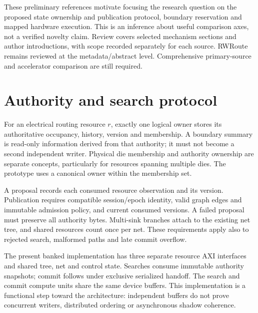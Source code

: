 \documentclass[10pt]{article}
\begin{document}
These preliminary references motivate focusing the research question on the
proposed state ownership and publication protocol, boundary reservation and mapped
hardware execution. This is an inference about useful comparison axes, not a
verified novelty claim. Review covers selected mechanism sections and author
introductions, with scope recorded separately for each source. RWRoute remains
reviewed at the metadata/abstract level. Comprehensive primary-source and
accelerator comparison are still required.

\section{Authority and search protocol}
For an electrical routing resource $r$, exactly one logical owner stores its
authoritative occupancy, history, version and membership. A boundary summary
is read-only information derived from that authority; it must not become a
second independent writer. Physical die membership and authority ownership
are separate concepts, particularly for resources spanning multiple dies.
The prototype uses a canonical owner within the membership set.

A proposal records each consumed resource observation and its version.
Publication requires compatible session/epoch identity, valid graph edges and
immutable admission policy, and current consumed versions. A failed proposal
must preserve all authority bytes. Multi-sink branches attach to the existing
net tree, and shared resources count once per net. These requirements apply
also to rejected search, malformed paths and late commit overflow.

The present banked implementation has three separate resource AXI interfaces
and shared tree, net and control state. Searches consume immutable authority
snapshots; commit follows under exclusive serialized handoff. The search and
commit compute units share the same device buffers. This implementation is a
functional step toward the architecture: independent buffers do not prove
concurrent writers, distributed ordering or asynchronous shadow coherence.
\end{document}
